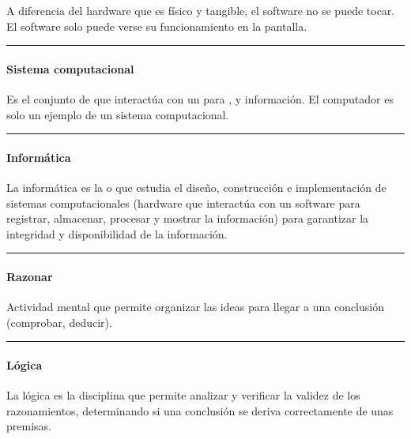\documentclass[letterpaper,10pt,spanish]{sphinxmanual}
\begin{document}
\sphinxAtStartPar
A diferencia del hardware que es físico y tangible, el software no se puede tocar. El software solo puede verse su funcionamiento en la pantalla.


\bigskip\hrule\bigskip



\paragraph{Sistema computacional}
\label{\detokenize{cursos/logica8/periodo01/R01:sistema-computacional}}
\sphinxAtStartPar
Es el conjunto de  que interactúa con un  para ,  y  información. El computador es solo un ejemplo de un sistema computacional.


\bigskip\hrule\bigskip



\paragraph{Informática}
\label{\detokenize{cursos/logica8/periodo01/R01:informatica}}
\sphinxAtStartPar
La informática es la  o  que estudia el diseño, construcción e implementación de sistemas computacionales (hardware que interactúa con un software para registrar, almacenar, procesar y mostrar la información) para garantizar la integridad y disponibilidad de la información.


\bigskip\hrule\bigskip



\paragraph{Razonar}
\label{\detokenize{cursos/logica8/periodo01/R01:razonar}}
\sphinxAtStartPar
Actividad mental que permite organizar las ideas para llegar a una conclusión (comprobar, deducir).


\bigskip\hrule\bigskip



\paragraph{Lógica}
\label{\detokenize{cursos/logica8/periodo01/R01:logica}}
\sphinxAtStartPar
La lógica es la disciplina que permite analizar y verificar la validez de los razonamientos, determinando si una conclusión se deriva correctamente de unas premisas.
\end{document}
